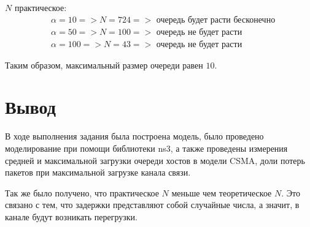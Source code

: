 \documentclass[a4paper, 14pt]{extarticle}
\begin{document}
$N$ практическое:
\begin{align*}
&\alpha =  10 => N = 724 => \text{ очередь будет расти бесконечно} \\
&\alpha =  50 => N = 100 => \text{ очередь не будет расти} \\
&\alpha = 100 => N =  43 => \text{ очередь не будет расти}
\end{align*}

Таким образом, максимальный размер очереди равен $10$.

\section{Вывод}
В ходе выполнения задания была построена модель, было проведено моделирование при помощи библиотеки ns3, а также проведены измерения средней и максимальной загрузки очереди хостов в модели CSMA, доли потерь пакетов при максимальной загрузке канала связи.

Так же было получено, что практическое $N$ меньше чем теоретическое $N$.
Это связано с тем, что задержки представляют собой случайные числа, а значит, в канале будут возникать перегрузки.
\end{document}
